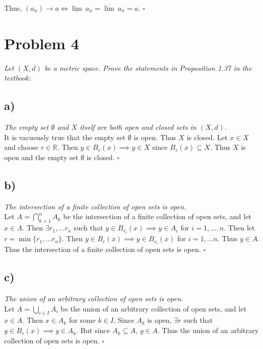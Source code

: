 \documentclass[12pt]{article}
\begin{document}
\noindent Thus, $(a_n) \rightarrow a \iff \underline{\lim}\ a_n = \overline{\lim}\ a_n = a$. \hfill $\square$

\section*{Problem 4}
{\it Let $(X,d)$ be a metric space.  Prove the statements in Proposition 1.37 in the textbook:}

\subsection*{ a)}
{\it The empty set $\emptyset$ and $X$ itself are both open and closed sets in $(X, d)$.} \\

It is vacuously true that the empty set $\emptyset$ is open.  Thus $X$ is closed.  Let $x \in X$ and choose $r \in \mathbb{R}$.  Then $y\in B_r(x) \implies y \in X$ since $B_r(x) \subseteq X$.  Thus $X$ is open and the empty set $\emptyset$ is closed. \hfill $\square$

\subsection*{ b)}
{\it The intersection of a finite collection of open sets is open.} \\

Let $A = \bigcap\limits_{k=1}^{n} A_k$ be the intersection of a finite collection of open sets, and let $x \in A$.  Then $\exists r_1, \dots r_n$ such that $y \in B_{r_i}(x) \implies y \in A_i$ for $i = 1, \dots, n$.  Then let $r = \min\{r_1, \dots r_n\}$.  Then $y \in B_r(x) \implies y \in B_{r_i}(x)$ for $i = 1, \dots n$.  Thus $y \in A$.  Thus the intersection of a finite collection of open sets is open. \hfill $\square$

\subsection*{ c)}
{\it The union of an arbitrary collection of open sets is open.} \\

Let $A = \bigcup\limits_{i\in I} A_i$ be the union of an arbitrary collection of open sets, and let $x \in A$.  Then $x \in A_k$ for some $k \in I$.  Since $A_k$ is open, $\exists r$ such that $y \in B_r(x) \implies y \in A_k$.  But since $A_k \subseteq A$, $y \in A$.  Thus the union of an arbitrary collection of open sets is open. \hfill $\square$
\end{document}
